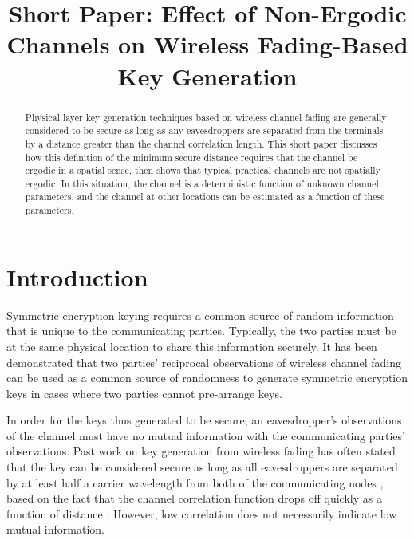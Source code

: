 \documentclass[conference]{ieeetran}
\author{\IEEEauthorblockN{K.~C.~Kerby-Patel}
\IEEEauthorblockA{Engineering Department\\
University of Massachusetts Boston\\
Boston, MA 02125\\
kc.kerby-patel@umb.edu}
}
\title{Short Paper: Effect of Non-Ergodic Channels on Wireless Fading-Based Key Generation}
\begin{document}
\maketitle

\begin{abstract}
Physical layer key generation techniques based on wireless channel fading are generally considered to be secure as long as any eavesdroppers are separated from the terminals by a distance greater than the channel correlation length.  This short paper discusses how this definition of the minimum secure distance requires that the channel be ergodic in a spatial sense, then shows that typical practical channels are not spatially ergodic.  In this situation, the channel   is a deterministic function of unknown channel parameters, and the channel at other locations can be estimated as a function of these parameters.
\end{abstract}
\section{Introduction}
Symmetric encryption keying requires a common source of random information that is unique to the communicating parties. Typically, the two parties must be at the same physical location to share this information securely.  
It has been demonstrated \cite{azimisadjadi2007, bloch2008, mathur2008, ye2010} that two parties' reciprocal observations of wireless channel fading can be used as a common source of randomness to generate symmetric encryption keys in cases where two parties cannot pre-arrange keys.  

In order for the keys thus generated to be secure, an eavesdropper's observations of the channel must have no mutual information with the communicating parties' observations.  Past work on key generation from wireless fading has often stated that the key can be considered secure as long as all eavesdroppers are separated by at least half a carrier wavelength from both of the communicating nodes \cite{azimisadjadi2007, bloch2008, mathur2008, ye2010}, based on the fact that the channel correlation function drops off quickly as a function of distance \cite{jakes1974}.  However, low correlation does not necessarily indicate low mutual information.  
\end{document}
